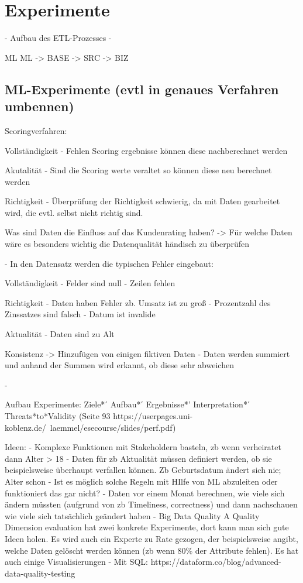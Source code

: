 \chapter{Experimente}\label{ch:experiments}


- Aufbau des ETL-Prozesses - 

            ML     ML
-> BASE -> SRC -> BIZ

\section{ML-Experimente (evtl in genaues Verfahren umbennen)}
Scoringverfahren:

Vollständigkeit
- Fehlen Scoring ergebnisse können diese nachberechnet werden

Akutalität
- Sind die Scoring werte veraltet so können diese neu berechnet werden


Richtigkeit
- Überprüfung der Richtigkeit schwierig, da mit Daten gearbeitet wird, die evtl. selbst nicht richtig sind. 

Was sind Daten die Einfluss auf das Kundenrating haben?
-> Für welche Daten wäre es besonders wichtig die Datenqualität händisch zu überprüfen





- In den Datensatz werden die typischen Fehler eingebaut:

Vollständigkeit
- Felder sind null 
- Zeilen fehlen

Richtigkeit
- Daten haben Fehler zb. Umsatz ist zu groß
- Prozentzahl des Zinssatzes sind falsch
- Datum ist invalide

Aktualität
- Daten sind zu Alt


Konsistenz
-> Hinzufügen von einigen fiktiven Daten 
- Daten werden summiert und anhand der Summen wird erkannt, ob diese sehr abweichen




-

Aufbau Experimente: 
Ziele*ʹ Aufbau*ʹ Ergebnisse*' Interpretation*ʹ Threats*to*Validity
(Seite 93 https://userpages.uni-koblenz.de/~laemmel/esecourse/slides/perf.pdf)


Ideen:
- Komplexe Funktionen mit Stakeholdern basteln, zb wenn verheiratet dann Alter > 18
- Daten für zb Aktualität müssen definiert werden, ob sie beispielsweise überhaupt verfallen können. Zb Geburtsdatum ändert sich nie; Alter schon
- Ist es möglich solche Regeln mit HIlfe von ML abzuleiten oder funktioniert das gar nicht? 
- Daten vor einem Monat berechnen, wie viele sich ändern müssten (aufgrund von zb Timeliness, correctness) und dann nachschauen wie viele sich tatsächlich geändert haben
- Big Data Quality A Quality Dimension evaluation hat zwei konkrete Experimente, dort kann man sich gute Ideen holen. Es wird auch ein Experte zu Rate gezogen, der beispielsweise angibt, welche Daten gelöscht werden können (zb wenn 80\% der Attribute fehlen). Es hat auch einige Visualisierungen 
- Mit SQL: 
https://dataform.co/blog/advanced-data-quality-testing


